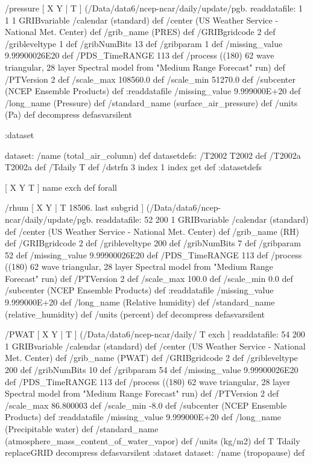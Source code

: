 \begin{ingrid}
  /pressure { [ X Y | T ] (/Data/data6/ncep-ncar/daily/update/pgb.%
  readdatafile:
  1 1 1 GRIBvariable
  /calendar (standard) def
  /center (US Weather Service - National Met. Center) def
  /grib_name (PRES) def
  /GRIBgridcode 2 def
  /gribleveltype 1 def
  /gribNumBits 13 def
  /gribparam 1 def
  /missing_value 9.99900026E20 def
  /PDS_TimeRANGE 113 def
  /process ((180) 62 wave triangular, 28 layer Spectral model from "Medium Range Forecast" run) def
  /PTVersion 2 def
  /scale_max 108560.0 def
  /scale_min 51270.0 def
  /subcenter (NCEP Ensemble Products) def
  :readdatafile
  /missing_value 9.999000E+20 def
  /long_name (Pressure) def
  /standard_name (surface_air_pressure) def
  /units (Pa) def
  decompress
  } defasvarsilent

 :dataset

 dataset: /name (total_air_column) def 
datasetdefs:
  /T2002 T2002 def
  /T2002a T2002a def
/Tdaily T def
/dstrfn 3 index 1 index get def
:datasetdefs

  [ X Y T ] { name exch def } forall

  /rhum { [ X Y | T 18506. last subgrid ] (/Data/data6/ncep-ncar/daily/update/pgb.%
  readdatafile:
  52 200 1 GRIBvariable
  /calendar (standard) def
  /center (US Weather Service - National Met. Center) def
  /grib_name (RH) def
  /GRIBgridcode 2 def
  /gribleveltype 200 def
  /gribNumBits 7 def
  /gribparam 52 def
  /missing_value 9.99900026E20 def
  /PDS_TimeRANGE 113 def
  /process ((180) 62 wave triangular, 28 layer Spectral model from "Medium Range Forecast" run) def
  /PTVersion 2 def
  /scale_max 100.0 def
  /scale_min 0.0 def
  /subcenter (NCEP Ensemble Products) def
  :readdatafile
  /missing_value 9.999000E+20 def
  /long_name (Relative humidity) def
  /standard_name (relative_humidity) def
  /units (percent) def
  decompress
  } defasvarsilent

  /PWAT { [ X Y | T ] (/Data/data6/ncep-ncar/daily/%
T exch ] 
  readdatafile:
  54 200 1 GRIBvariable
  /calendar (standard) def
  /center (US Weather Service - National Met. Center) def
  /grib_name (PWAT) def
  /GRIBgridcode 2 def
  /gribleveltype 200 def
  /gribNumBits 10 def
  /gribparam 54 def
  /missing_value 9.99900026E20 def
  /PDS_TimeRANGE 113 def
  /process ((180) 62 wave triangular, 28 layer Spectral model from "Medium Range Forecast" run) def
  /PTVersion 2 def
  /scale_max 86.800003 def
  /scale_min -8.0 def
  /subcenter (NCEP Ensemble Products) def
  :readdatafile
  /missing_value 9.999000E+20 def
  /long_name (Precipitable water) def
  /standard_name (atmosphere_mass_content_of_water_vapor) def
  /units (kg/m2) def
T Tdaily replaceGRID
  decompress
  } defasvarsilent
 :dataset
 dataset: /name (tropopause) def 


\end{ingrid}
